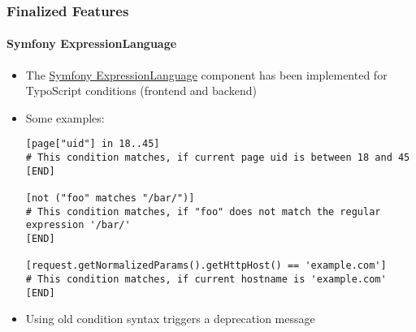 
\begin{frame}[fragile]
	\frametitle{Finalized Features}
	\framesubtitle{Symfony ExpressionLanguage}

	\lstset{basicstyle=\tiny\ttfamily}

	\begin{itemize}
		\item The \href{https://symfony.com/doc/current/components/expression_language/syntax.html}{Symfony ExpressionLanguage}
			component has been implemented for TypoScript conditions (frontend
			and backend)
		\item Some examples:

\begin{lstlisting}
[page["uid"] in 18..45]
# This condition matches, if current page uid is between 18 and 45
[END]

[not ("foo" matches "/bar/")]
# This condition matches, if "foo" does not match the regular expression '/bar/'
[END]

[request.getNormalizedParams().getHttpHost() == 'example.com']
# This condition matches, if current hostname is 'example.com'
[END]
\end{lstlisting}

		\item Using old condition syntax triggers a deprecation message
	\end{itemize}

\end{frame}


